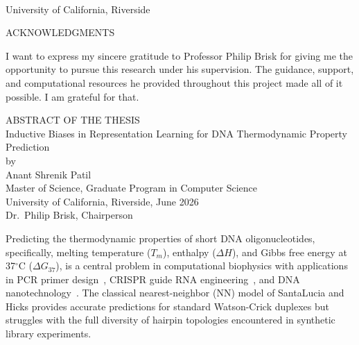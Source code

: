 \documentclass[12pt,oneside,letterpaper]{report}
\begin{document}
\vspace{0.55in}
\noindent \makebox[0.20\textwidth]{} \makebox[0.75\textwidth]{\hrulefill}

\vspace{0.55in}
\noindent \makebox[0.20\textwidth]{} \makebox[0.75\textwidth]{\hrulefill}

\vspace{0.55in}
\noindent \makebox[0.20\textwidth]{} \makebox[0.75\textwidth]{\hrulefill}\\[-4pt]
\makebox[0.20\textwidth]{} 

\vspace{1.0in}
\begin{center}
    University of California, Riverside
\end{center}
\clearpage

\setcounter{page}{4}
\begin{center}
    ACKNOWLEDGMENTS
\end{center}
\vspace{0.5in}

I want to express my sincere gratitude to Professor Philip Brisk for giving me the opportunity to pursue this research under his supervision. The guidance, support, and computational resources he provided throughout this project made all of it possible. I am grateful for that.

\clearpage

\begin{singlespace}
\begin{center}
    ABSTRACT OF THE THESIS \\
    \vspace{0.2in}
    Inductive Biases in Representation Learning for DNA Thermodynamic Property Prediction \\[0pt]
    by \\[0pt]
    Anant Shrenik Patil \\[0pt]
    Master of Science, Graduate Program in Computer Science \\[0pt]
    University of California, Riverside, June 2026 \\[0pt]
    Dr.\ Philip Brisk, Chairperson
\end{center}
\end{singlespace}
\vspace{0.5in}

Predicting the thermodynamic properties of short DNA oligonucleotides, specifically, melting temperature ($T_m$), enthalpy ($\Delta H$), and Gibbs free energy at 37$^\circ$C ($\Delta G_{37}$), is a central problem in computational biophysics with applications in PCR primer design~\cite{santalucia1998}, CRISPR guide RNA engineering~\cite{doench2016}, and DNA nanotechnology~\cite{seeman2018}. The classical nearest-neighbor (NN) model of SantaLucia and Hicks provides accurate predictions for standard Watson-Crick duplexes but struggles with the full diversity of hairpin topologies encountered in synthetic library experiments.
\end{document}

